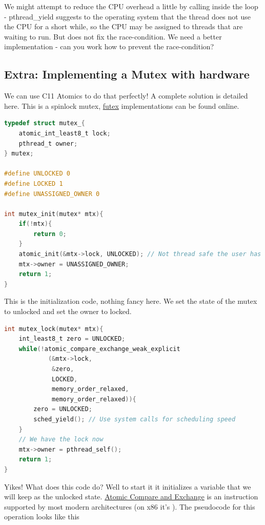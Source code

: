 We might attempt to reduce the CPU overhead a little by calling  inside the loop - pthread\_yield suggests to the operating system that the thread does not use the CPU for a short while, so the CPU may be assigned to threads that are waiting to run. But does not fix the race-condition. We need a better implementation - can you work how to prevent the race-condition?


\subsection{Extra: Implementing a Mutex with hardware}

We can use C11 Atomics to do that perfectly! A complete solution is detailed here. This is a spinlock mutex, \href{https://locklessinc.com/articles/mutex_cv_futex/}{futex} implementations can be found online.

\begin{lstlisting}[language=C]
typedef struct mutex_{
    atomic_int_least8_t lock;
    pthread_t owner;
} mutex;

#define UNLOCKED 0
#define LOCKED 1
#define UNASSIGNED_OWNER 0

int mutex_init(mutex* mtx){
    if(!mtx){
        return 0;
    }
    atomic_init(&mtx->lock, UNLOCKED); // Not thread safe the user has to take care of this
    mtx->owner = UNASSIGNED_OWNER;
    return 1;
}
\end{lstlisting}

This is the initialization code, nothing fancy here. We set the state of the mutex to unlocked and set the owner to locked.

\begin{lstlisting}[language=C]
int mutex_lock(mutex* mtx){
    int_least8_t zero = UNLOCKED;
    while(!atomic_compare_exchange_weak_explicit
            (&mtx->lock, 
             &zero, 
             LOCKED,
             memory_order_relaxed,
             memory_order_relaxed)){
        zero = UNLOCKED;
        sched_yield(); // Use system calls for scheduling speed
    }
    // We have the lock now
    mtx->owner = pthread_self();
    return 1;
}
\end{lstlisting}

Yikes! What does this code do? Well to start it it initializes a variable that we will keep as the unlocked state. \href{https://en.wikipedia.org/wiki/Compare-and-swap}{Atomic Compare and Exchange} is an instruction supported by most modern architectures (on x86 it's ). The pseudocode for this operation looks like this

